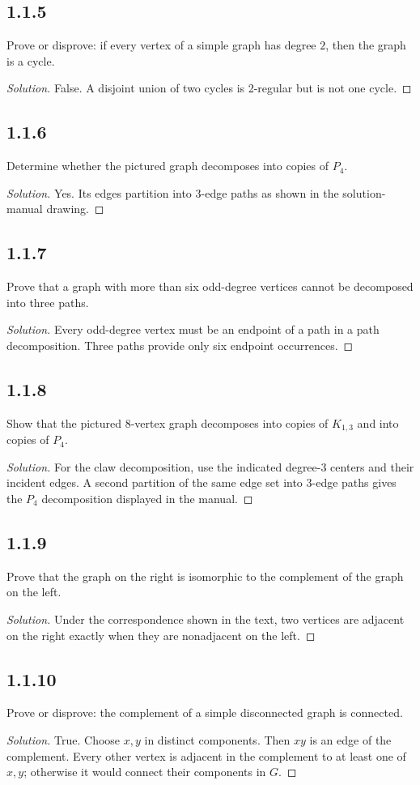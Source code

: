 \documentclass[12pt]{amsart}
\newenvironment{solution}{\begin{proof}[Solution]}{\end{proof}}
\begin{document}
    \subsection*{1.1.5} Prove or disprove: if every vertex of a simple graph has degree $2$, then the graph is a cycle.
    \begin{solution}False. A disjoint union of two cycles is 2-regular but is not one cycle.\end{solution}
    \subsection*{1.1.6} Determine whether the pictured graph decomposes into copies of $P_4$.
    \begin{solution}Yes. Its edges partition into 3-edge paths as shown in the solution-manual drawing.\end{solution}
    \subsection*{1.1.7} Prove that a graph with more than six odd-degree vertices cannot be decomposed into three paths.
    \begin{solution}Every odd-degree vertex must be an endpoint of a path in a path decomposition. Three paths provide only six endpoint occurrences.\end{solution}
    \subsection*{1.1.8} Show that the pictured 8-vertex graph decomposes into copies of $K_{1,3}$ and into copies of $P_4$.
    \begin{solution}For the claw decomposition, use the indicated degree-3 centers and their incident edges. A second partition of the same edge set into 3-edge paths gives the $P_4$ decomposition displayed in the manual.\end{solution}
    \subsection*{1.1.9} Prove that the graph on the right is isomorphic to the complement of the graph on the left.
    \begin{solution}Under the correspondence shown in the text, two vertices are adjacent on the right exactly when they are nonadjacent on the left.\end{solution}
    \subsection*{1.1.10} Prove or disprove: the complement of a simple disconnected graph is connected.
    \begin{solution}True. Choose $x,y$ in distinct components. Then $xy$ is an edge of the complement. Every other vertex is adjacent in the complement to at least one of $x,y$; otherwise it would connect their components in $G$.\end{solution}
\end{document}
